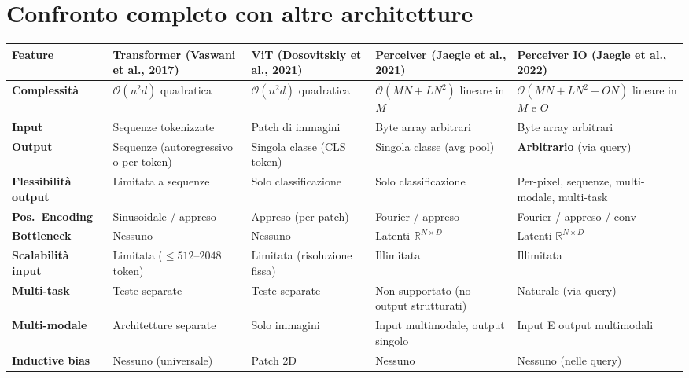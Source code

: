 \documentclass[12pt,a4paper]{article}
\begin{document}
\section{Confronto completo con altre architetture}

\begin{center}
\footnotesize
\begin{tabular}{p{2.8cm}p{2.6cm}p{2.6cm}p{2.6cm}p{2.6cm}}
\toprule
\textbf{Feature} & \textbf{Transformer} (Vaswani et al., 2017) & \textbf{ViT} (Dosovitskiy et al., 2021) & \textbf{Perceiver} (Jaegle et al., 2021) & \textbf{Perceiver IO} (Jaegle et al., 2022) \\
\midrule
\textbf{Complessit\`a} & $\mathcal{O}(n^2 d)$ quadratica & $\mathcal{O}(n^2 d)$ quadratica & $\mathcal{O}(MN + LN^2)$ lineare in $M$ & $\mathcal{O}(MN + LN^2 + ON)$ lineare in $M$ e $O$ \\
\midrule
\textbf{Input} & Sequenze tokenizzate & Patch di immagini & Byte array arbitrari & Byte array arbitrari \\
\midrule
\textbf{Output} & Sequenze (autoregressivo o per-token) & Singola classe (CLS token) & Singola classe (avg pool) & \textbf{Arbitrario} (via query) \\
\midrule
\textbf{Flessibilit\`a output} & Limitata a sequenze & Solo classificazione & Solo classificazione & Per-pixel, sequenze, multi-modale, multi-task \\
\midrule
\textbf{Pos.\ Encoding} & Sinusoidale / appreso & Appreso (per patch) & Fourier / appreso & Fourier / appreso / conv \\
\midrule
\textbf{Bottleneck} & Nessuno & Nessuno & Latenti $\mathbb{R}^{N \times D}$ & Latenti $\mathbb{R}^{N \times D}$ \\
\midrule
\textbf{Scalabilit\`a input} & Limitata ($\leq 512$--$2048$ token) & Limitata (risoluzione fissa) & Illimitata & Illimitata \\
\midrule
\textbf{Multi-task} & Teste separate & Teste separate & Non supportato (no output strutturati) & Naturale (via query) \\
\midrule
\textbf{Multi-modale} & Architetture separate & Solo immagini & Input multimodale, output singolo & Input E output multimodali \\
\midrule
\textbf{Inductive bias} & Nessuno (universale) & Patch 2D & Nessuno & Nessuno (nelle query) \\
\bottomrule
\end{tabular}
\end{center}
\end{document}
